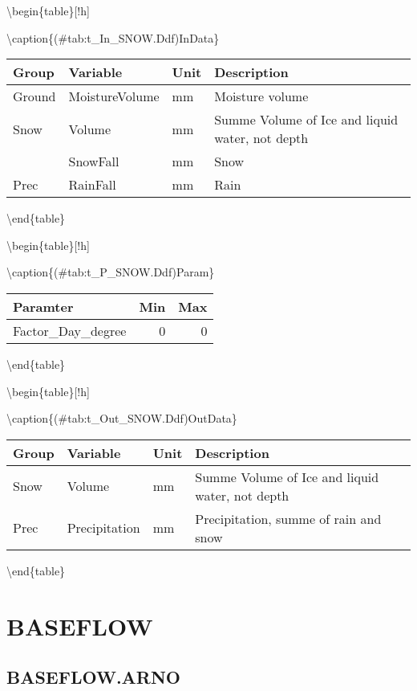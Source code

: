 \documentclass[
]{book}
\begin{document}
\textbackslash begin\{table\}{[}!h{]}

\textbackslash caption\{(\#tab:t\_In\_SNOW.Ddf)InData\}
\centering

\begin{tabular}[t]{l|l|l|l}
\hline
Group & Variable & Unit & Description\\
\hline
Ground & MoistureVolume & mm & Moisture volume\\
\cline{1-4}
Snow & Volume & mm & Summe Volume of Ice and liquid water, not depth\\
\cline{1-4}
 & SnowFall & mm & Snow\\
\cline{2-4}
\multirow{-2}{*}{\raggedright\arraybackslash Prec} & RainFall & mm & Rain\\
\hline
\end{tabular}

\textbackslash end\{table\}

\textbackslash begin\{table\}{[}!h{]}

\textbackslash caption\{(\#tab:t\_P\_SNOW.Ddf)Param\}
\centering

\begin{tabular}[t]{l|r|r}
\hline
Paramter & Min & Max\\
\hline
Factor\_Day\_degree & 0 & 0\\
\hline
\end{tabular}

\textbackslash end\{table\}

\textbackslash begin\{table\}{[}!h{]}

\textbackslash caption\{(\#tab:t\_Out\_SNOW.Ddf)OutData\}
\centering

\begin{tabular}[t]{l|l|l|l}
\hline
Group & Variable & Unit & Description\\
\hline
Snow & Volume & mm & Summe Volume of Ice and liquid water, not depth\\
\cline{1-4}
Prec & Precipitation & mm & Precipitation, summe of rain and snow\\
\hline
\end{tabular}

\textbackslash end\{table\}

\hypertarget{baseflow}{%
\section{BASEFLOW}\label{baseflow}}

\hypertarget{baseflow.arno}{%
\subsection{BASEFLOW.ARNO}\label{baseflow.arno}}
\end{document}
